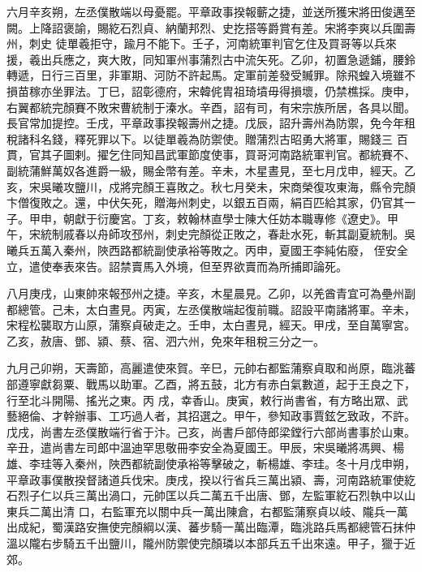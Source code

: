 \begin{pinyinscope}
 六月辛亥朔，左丞僕散端以母憂罷。平章政事揆報蘄之捷，並送所獲宋將田俊邁至闕。上降詔褒諭，賜紇石烈貞、納蘭邦烈、史扢搭等爵賞有差。宋將李爽以兵圍壽州，刺史
 徒單羲拒守，踰月不能下。壬子，河南統軍判官乞住及買哥等以兵來援，羲出兵應之，爽大敗，同知軍州事蒲烈古中流矢死。乙卯，初置急遞鋪，腰鈴轉遞，日行三百里，非軍期、河防不許起馬。定軍前差發受贓罪。除飛蝗入境雖不損苗稼亦坐罪法。丁巳，詔彰德府，宋韓侂胄祖琦墳毋得損壞，仍禁樵採。庚申，右翼都統完顏賽不敗宋曹統制于溱水。辛酉，詔有司，有宋宗族所居，各具以聞。長官常加提控。壬戌，平章政事揆報壽州之捷。戊辰，詔升壽州為防禦，免今年租稅諸科名錢，釋死罪以下。以徒單羲為防禦使。贈蒲烈古昭勇大將軍，賜錢三
 百貫，官其子圖剌。擢乞住同知昌武軍節度使事，買哥河南路統軍判官。都統賽不、副統蒲鮮萬奴各進爵一級，賜金幣有差。辛未，木星晝見，至七月戊申，經天。乙亥，宋吳曦攻鹽川，戍將完顏王喜敗之。秋七月癸未，宋商榮復攻東海，縣令完顏卞僧復敗之。還，中伏矢死，贈海州刺史，以銀五百兩，絹百匹給其家，仍官其一子。甲申，朝獻于衍慶宮。丁亥，敕翰林直學士陳大任妨本職專修《遼史》。甲午，宋統制戚春以舟師攻邳州，刺史完顏從正敗之，春赴水死，斬其副夏統制。吳曦兵五萬入秦州，陜西路都統副使承裕等敗之。丙申，夏國王李純佑廢，
 侄安全立，遣使奉表來告。詔禁賣馬入外境，但至界欲賣而為所捕即論死。



 八月庚戌，山東帥來報邳州之捷。辛亥，木星晨見。乙卯，以羌酋青宜可為壘州副都總管。己未，太白晝見。丙寅，左丞僕散端起復前職。詔設平南諸將軍。辛未，宋程松襲取方山原，蒲察貞破走之。壬申，太白晝見，經天。甲戌，至自萬寧宮。乙亥，赦唐、鄧、潁、蔡、宿、泗六州，免來年租稅三分之一。



 九月己卯朔，天壽節，高麗遣使來賀。辛巳，元帥右都監蒲察貞取和尚原，臨洮蕃部遵寧獻芻粟、戰馬以助軍。乙酉，將五鼓，北方有赤白氣數道，起于王良之下，行至北斗開陽、搖光之東。丙
 戌，幸香山。庚寅，敕行尚書省，有方略出眾、武藝絕倫、才幹辦事、工巧過人者，其招選之。甲午，參知政事賈鉉乞致政，不許。戊戌，尚書左丞僕散端行省于汴。己亥，尚書戶部侍郎梁鏜行六部尚書事於山東。辛丑，遣尚書左司郎中溫迪罕思敬冊李安全為夏國王。甲辰，宋吳曦將馮興、楊雄、李珪等入秦州，陜西都統副使承裕等擊破之，斬楊雄、李珪。冬十月戊申朔，平章政事僕散揆督諸道兵伐宋。庚戌，揆以行省兵三萬出潁、壽，河南路統軍使紇石烈子仁以兵三萬出渦口，元帥匡以兵二萬五千出唐、鄧，左監軍紇石烈執中以山東兵二萬出清
 口，右監軍充以關中兵一萬出陳倉，右都監蒲察貞以岐、隴兵一萬出成紀，蜀漢路安撫使完顏綱以漢、蕃步騎一萬出臨潭，臨洮路兵馬都總管石抹仲溫以隴右步騎五千出鹽川，隴州防禦使完顏璘以本部兵五千出來遠。甲子，獵于近郊。




\end{pinyinscope}
